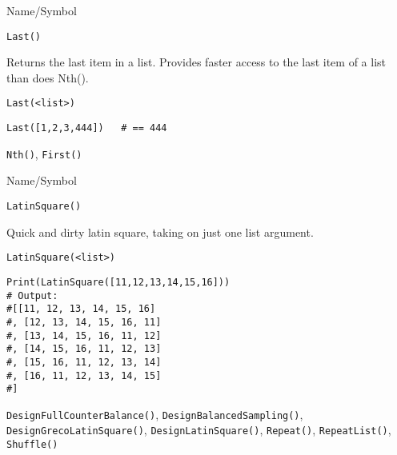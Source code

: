 \begin{desc}{Name/Symbol}
\item[Name/Symbol]	\verb+Last()+

\item[Description]	Returns the last item in a list. Provides faster 
		access to the last item of a list than does Nth().

\item[Usage]
\begin{verbatim}
Last(<list>)
\end{verbatim}

\item[Example]
\begin{verbatim}
Last([1,2,3,444])	# == 444
\end{verbatim}

\item[See Also]	\verb+Nth()+, \verb+First()+
\end{desc}

\rl





\begin{desc}{Name/Symbol}
\item[Name/Symbol]	\verb+LatinSquare()+

\item[Description]	Quick and dirty latin square, taking on just one
  list argument.

\item[Usage]
\begin{verbatim}
LatinSquare(<list>)
\end{verbatim}

\item[Example]
\begin{verbatim}
Print(LatinSquare([11,12,13,14,15,16]))
# Output:
#[[11, 12, 13, 14, 15, 16]
#, [12, 13, 14, 15, 16, 11]
#, [13, 14, 15, 16, 11, 12]
#, [14, 15, 16, 11, 12, 13]
#, [15, 16, 11, 12, 13, 14]
#, [16, 11, 12, 13, 14, 15]
#]

\end{verbatim}

\item[See Also] \verb+DesignFullCounterBalance()+,
  \verb+DesignBalancedSampling()+, \verb+DesignGrecoLatinSquare()+,
  \verb+DesignLatinSquare()+, \verb+Repeat()+, \verb+RepeatList()+,
  \verb+Shuffle()+

\end{desc}

\rl





